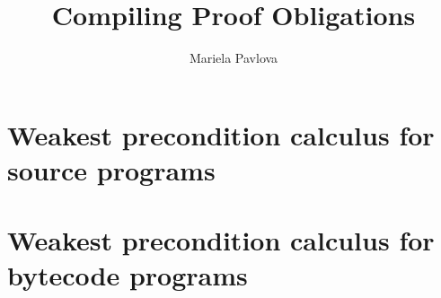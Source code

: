 \documentclass[a4paper]{article}
\title{Compiling Proof Obligations }
\author{Mariela Pavlova}
\begin{document}
\maketitle
\tableofcontents
\newpage 
   
   
   
   
   
	 

   
          
	  
	  
	 
	 


	 
   \section{Weakest precondition calculus for source programs}\label{pog:wpSrcGeneral}
    
   	  
   
   

   \section{Weakest precondition calculus for bytecode programs}\label{pog:wpBcGeneral}
   
   
  
  
     


\end{document}
